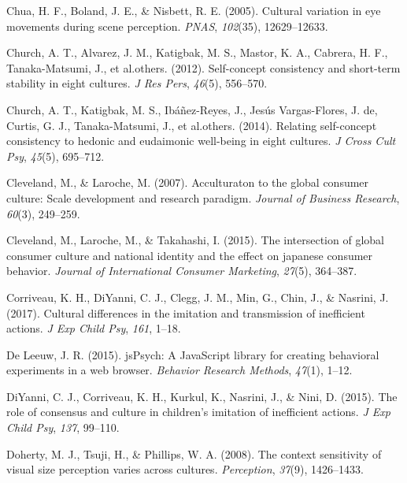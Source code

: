 \documentclass[
  man]{apa6}
\newlength{\cslhangindent}
\newlength{\cslentryspacingunit} %
\newenvironment{CSLReferences}[2] %
 {%
  \setlength{\parindent}{0pt}
  \ifodd #1
  \let\oldpar\par
  \def\par{\hangindent=\cslhangindent\oldpar}
  \fi
  \setlength{\parskip}{#2\cslentryspacingunit}
 }%
 {}
\begin{document}
\begin{CSLReferences}{1}{0}
\leavevmode{}%
Chua, H. F., Boland, J. E., \& Nisbett, R. E. (2005). Cultural variation in eye movements during scene perception. \emph{PNAS}, \emph{102}(35), 12629--12633.

\leavevmode{}%
Church, A. T., Alvarez, J. M., Katigbak, M. S., Mastor, K. A., Cabrera, H. F., Tanaka-Matsumi, J., et al.others. (2012). Self-concept consistency and short-term stability in eight cultures. \emph{J Res Pers}, \emph{46}(5), 556--570.

\leavevmode{}%
Church, A. T., Katigbak, M. S., Ibáñez-Reyes, J., Jesús Vargas-Flores, J. de, Curtis, G. J., Tanaka-Matsumi, J., et al.others. (2014). Relating self-concept consistency to hedonic and eudaimonic well-being in eight cultures. \emph{J Cross Cult Psy}, \emph{45}(5), 695--712.

\leavevmode{}%
Cleveland, M., \& Laroche, M. (2007). Acculturaton to the global consumer culture: Scale development and research paradigm. \emph{Journal of Business Research}, \emph{60}(3), 249--259.

\leavevmode{}%
Cleveland, M., Laroche, M., \& Takahashi, I. (2015). The intersection of global consumer culture and national identity and the effect on japanese consumer behavior. \emph{Journal of International Consumer Marketing}, \emph{27}(5), 364--387.

\leavevmode{}%
Corriveau, K. H., DiYanni, C. J., Clegg, J. M., Min, G., Chin, J., \& Nasrini, J. (2017). Cultural differences in the imitation and transmission of inefficient actions. \emph{J Exp Child Psy}, \emph{161}, 1--18.

\leavevmode{}%
De Leeuw, J. R. (2015). jsPsych: A JavaScript library for creating behavioral experiments in a web browser. \emph{Behavior Research Methods}, \emph{47}(1), 1--12.

\leavevmode{}%
DiYanni, C. J., Corriveau, K. H., Kurkul, K., Nasrini, J., \& Nini, D. (2015). The role of consensus and culture in children's imitation of inefficient actions. \emph{J Exp Child Psy}, \emph{137}, 99--110.

\leavevmode{}%
Doherty, M. J., Tsuji, H., \& Phillips, W. A. (2008). The context sensitivity of visual size perception varies across cultures. \emph{Perception}, \emph{37}(9), 1426--1433.


\end{CSLReferences}
\end{document}
